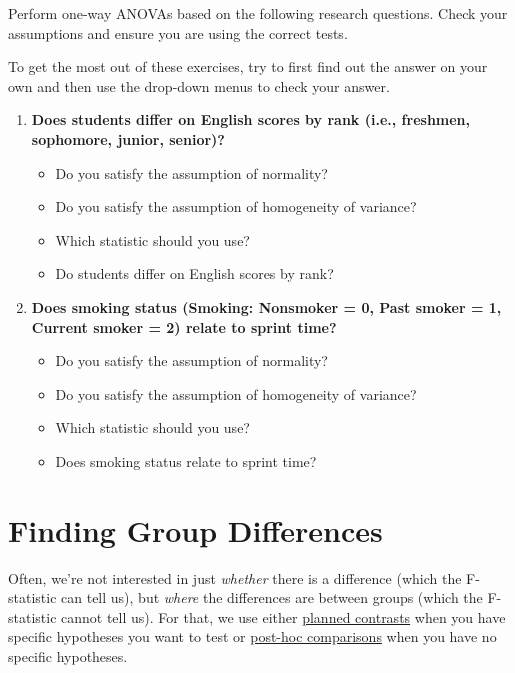 \documentclass[
]{book}
\begin{document}
Perform one-way ANOVAs based on the following research questions. Check your assumptions and ensure you are using the correct tests.

To get the most out of these exercises, try to first find out the answer on your own and then use the drop-down menus to check your answer.

\begin{enumerate}
\def\labelenumi{\arabic{enumi}.}
\item
  \textbf{Does students differ on English scores by rank (i.e., freshmen, sophomore, junior, senior)?}

  \begin{itemize}
  \item
    Do you satisfy the assumption of normality?
  \item
    Do you satisfy the assumption of homogeneity of variance?
  \item
    Which statistic should you use?
  \item
    Do students differ on English scores by rank?
  \end{itemize}
\item
  \textbf{Does smoking status (Smoking: Nonsmoker = 0, Past smoker = 1, Current smoker = 2) relate to sprint time?}

  \begin{itemize}
  \item
    Do you satisfy the assumption of normality?
  \item
    Do you satisfy the assumption of homogeneity of variance?
  \item
    Which statistic should you use?
  \item
    Does smoking status relate to sprint time?
  \end{itemize}
\end{enumerate}

\hypertarget{finding-group-differences}{%
\section{Finding Group Differences}\label{finding-group-differences}}

Often, we're not interested in just \emph{whether} there is a difference (which the F-statistic can tell us), but \emph{where} the differences are between groups (which the F-statistic cannot tell us). For that, we use either \underline{planned contrasts} when you have specific hypotheses you want to test or \underline{post-hoc comparisons} when you have no specific hypotheses.
\end{document}
